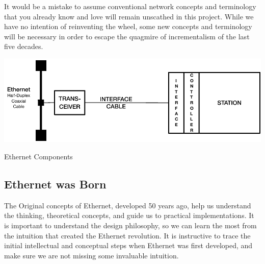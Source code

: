 It would be a mistake to assume conventional network concepts and terminology that you already know and love will remain unscathed in this project. While we have no intention of reinventing the wheel,  some new concepts and terminology will be necessary in order to escape the quagmire of incrementalism of the last five decades.  


 
 \begin{marginfigure}
  \includegraphics[width=1.2\linewidth]{../../FIGURES/Original-Ethernt.pdf}
    \caption{Ethernet Components} 
  \vspace{1em}
\end{marginfigure}

\subsection{Ethernet was Born}

The Original concepts of Ethernet, developed 50 years ago, help us understand the thinking, theoretical concepts, and guide us  to practical implementations. It is important to understand the design philosophy, so we can learn the most from the intuition that created the Ethernet revolution.  It is instructive to trace the initial intellectual and conceptual steps when Ethernet was first developed, and make sure we are not missing some invaluable intuition.


